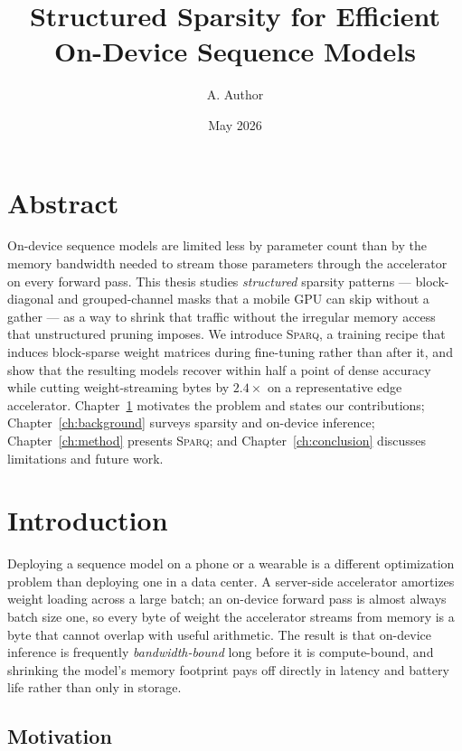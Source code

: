 \documentclass[11pt,twoside]{book}
\title{Structured Sparsity for Efficient On-Device Sequence Models}
\author{A. Author}
\date{May 2026}
\newcommand{\model}{\textsc{Sparq}\xspace}
\begin{document}
\frontmatter

\maketitle

\chapter*{Abstract}

On-device sequence models are limited less by parameter count than by the
memory bandwidth needed to stream those parameters through the
accelerator on every forward pass. This thesis studies \emph{structured}
sparsity patterns --- block-diagonal and grouped-channel masks that a
mobile GPU can skip without a gather --- as a way to shrink that traffic
without the irregular memory access that unstructured pruning imposes.
We introduce \model, a training recipe that induces block-sparse weight
matrices during fine-tuning rather than after it, and show that the
resulting models recover within half a point of dense accuracy while
cutting weight-streaming bytes by \(2.4\times\) on a representative
edge accelerator. Chapter~\ref{ch:intro} motivates the problem and states
our contributions; Chapter~\ref{ch:background} surveys sparsity and
on-device inference; Chapter~\ref{ch:method} presents \model; and
Chapter~\ref{ch:conclusion} discusses limitations and future work.

\tableofcontents

\mainmatter

\chapter{Introduction}
\label{ch:intro}

Deploying a sequence model on a phone or a wearable is a different
optimization problem than deploying one in a data center. A server-side
accelerator amortizes weight loading across a large batch; an on-device
forward pass is almost always batch size one, so every byte of weight
the accelerator streams from memory is a byte that cannot overlap with
useful arithmetic. The result is that on-device inference is frequently
\emph{bandwidth-bound} long before it is compute-bound, and shrinking
the model's memory footprint pays off directly in latency and battery
life rather than only in storage.

\section{Motivation}
\label{sec:motivation}
\end{document}
